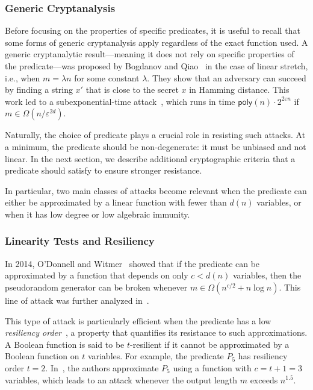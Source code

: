\subsubsection{Generic Cryptanalysis}

Before focusing on the properties of specific predicates, it is useful to recall that some forms of generic cryptanalysis apply regardless of the exact function used. 
A generic cryptanalytic result—meaning it does not rely on specific properties of the predicate—was proposed by Bogdanov and Qiao~\cite{DBLP:conf/approx/BogdanovQ09} in the case of linear stretch, i.e., when $m = \lambda n$ for some constant $\lambda$. They show that an adversary can succeed by finding a string $x'$ that is close to the secret $x$ in Hamming distance. This work led to a subexponential-time attack~\cite{EPRINT:Applebaum15}, which runs in time $\mathsf{poly}(n) \cdot 2^{2\varepsilon n}$ if $m \in \Omega(n / \varepsilon^{2d})$.

Naturally, the choice of predicate plays a crucial role in resisting such attacks. At a minimum, the predicate should be non-degenerate: it must be unbiased and not linear. In the next section, we describe additional cryptographic criteria that a predicate should satisfy to ensure stronger resistance.

In particular, two main classes of attacks become relevant when the predicate can either be approximated by a linear function with fewer than $d(n)$ variables, or when it has low degree or low algebraic immunity.



\subsubsection{Linearity Tests and Resiliency}


In 2014, O'Donnell and Witmer~\cite{DBLP:conf/coco/ODonnellW14} showed that if the predicate can be approximated by a function that depends on only $c < d(n)$ variables, then the pseudorandom generator can be broken whenever $m \in \Omega(n^{c/2} + n \log n)$. This line of attack was further analyzed in~\cite{EPRINT:Applebaum15}.

This type of attack is particularly efficient when the predicate has a low \emph{resiliency order}~\cite{DBLP:journals/tit/Siegenthaler84}, a property that quantifies its resistance to such approximations. A Boolean function is said to be $t$-resilient if  it cannot be approximated by a Boolean function on $t$ variables. For example, the predicate $P_5$ has resiliency order $t = 2$. In~\cite{DBLP:conf/coco/ODonnellW14}, the authors approximate $P_5$ using a function with $c = t + 1 = 3$ variables, which leads to an attack whenever the output length $m$ exceeds $n^{1.5}$.

